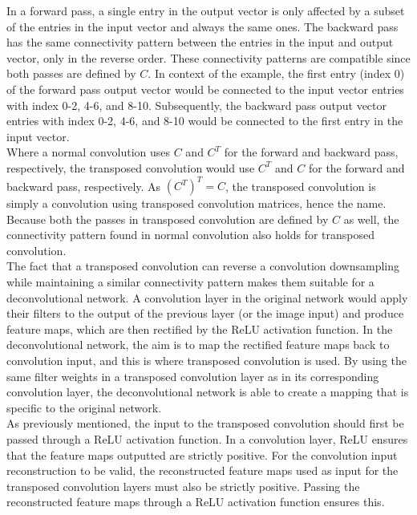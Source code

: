 \noindent In a forward pass, a single entry in the output vector is only affected by a subset of the entries in the input vector and always the same ones. The backward pass has the same connectivity pattern between the entries in the input and output vector, only in the reverse order. These connectivity patterns are compatible since both passes are defined by $C$. In context of the example, the first entry (index 0) of the forward pass output vector would be connected to the input vector entries with index 0-2, 4-6, and 8-10. Subsequently, the backward pass output vector entries with index 0-2, 4-6, and 8-10 would be connected to the first entry in the input vector.\\

\noindent Where a normal convolution uses $C$ and $C^T$ for the forward and backward pass, respectively, the transposed convolution would use $C^T$ and $C$ for the forward and backward pass, respectively. As $(C^T)^T=C$, the transposed convolution is simply a convolution using transposed convolution matrices, hence the name. Because both the passes in transposed convolution are defined by $C$ as well, the connectivity pattern found in normal convolution also holds for transposed convolution. \\

\noindent The fact that a transposed convolution can reverse a convolution downsampling while maintaining a similar connectivity pattern makes them suitable for a deconvolutional network. A convolution layer in the original network would apply their filters to the output of the previous layer (or the image input) and produce feature maps, which are then rectified by the ReLU activation function. In the deconvolutional network, the aim is to map the rectified feature maps back to convolution input, and this is where transposed convolution is used. By using the same filter weights in a transposed convolution layer as in its corresponding convolution layer, the deconvolutional network is able to create a mapping that is specific to the original network. \\

\noindent As previously mentioned, the input to the transposed convolution should first be passed through a ReLU activation function. In a convolution layer, ReLU ensures that the feature maps outputted are strictly positive. For the convolution input reconstruction to be valid, the reconstructed feature maps used as input for the transposed convolution layers must also be strictly positive. Passing the reconstructed feature maps through a ReLU activation function ensures this. \\


